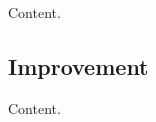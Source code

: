 \documentclass{article}
\begin{document}
Content.

\subsection{Improvement}

Content.




\end{document}
